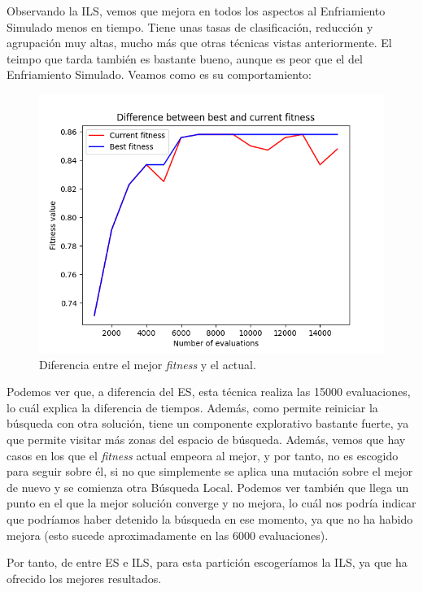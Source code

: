 \documentclass[11pt,a4paper]{article}
\begin{document}
Observando la ILS, vemos que mejora en todos los aspectos al Enfriamiento Simulado menos en tiempo. Tiene unas tasas de
clasificación, reducción y agrupación muy altas, mucho más que otras técnicas vistas anteriormente. El teimpo que tarda también es
bastante bueno, aunque es peor que el del Enfriamiento Simulado. Veamos como es su comportamiento:

\begin{figure}[H]
\centering
\includegraphics[scale=0.4]{img/colposcopy-ils.png}
\caption{Diferencia entre el mejor \textit{fitness} y el actual.}
\end{figure}

Podemos ver que, a diferencia del ES, esta técnica realiza las 15000 evaluaciones, lo cuál explica la diferencia de tiempos. Además,
como permite reiniciar la búsqueda con otra solución, tiene un componente explorativo bastante fuerte, ya que permite visitar más
zonas del espacio de búsqueda. Además, vemos que hay casos en los que el \textit{fitness} actual empeora al mejor, y por tanto,
no es escogido para seguir sobre él, si no que simplemente se aplica una mutación sobre el mejor de nuevo y se comienza otra
Búsqueda Local. Podemos ver también que llega un punto en el que la mejor solución converge y no mejora, lo cuál nos podría
indicar que podríamos haber detenido la búsqueda en ese momento, ya que no ha habido mejora (esto sucede aproximadamente
en las 6000 evaluaciones).

Por tanto, de entre ES e ILS, para esta partición escogeríamos la ILS, ya que ha ofrecido los mejores resultados.
\end{document}
